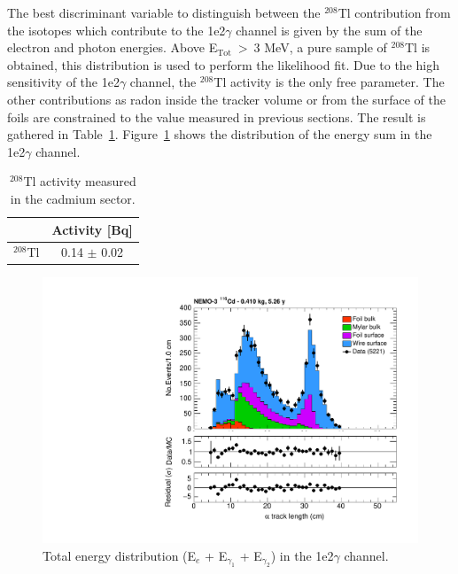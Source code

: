 \documentclass[main.tex]{subfiles}
\begin{document}
\bigskip


\NI The best discriminant variable to distinguish between the $^{\text{208}}$Tl contribution from the isotopes which contribute to the 1e2$\gamma$ channel is given by the sum of the electron and photon energies.  Above E$_{\text{Tot}}~>~$3 MeV, a pure sample of $^{\text{208}}$Tl is obtained, this distribution is used to perform the likelihood fit. Due to the high sensitivity of the 1e2$\gamma$ channel, the $^{\text{208}}$Tl activity is the only free parameter. The other contributions as radon inside the tracker volume or from the surface of the foils are constrained to the value measured in previous sections. The result is gathered in Table~\ref{TableTl208}. Figure~\ref{1e2gChannel_Etot} shows the distribution of the energy sum in the 1e2$\gamma$ channel.


\begin{table}[h!]
\centering
\begin{tabular}{c|c}
 & Activity [Bq] \\
\toprule
$^{\text{208}}$Tl & 0.14 $\pm$ 0.02 \\ 
\bottomrule
\end{tabular}
\caption{$^{\text{208}}$Tl activity measured in the cadmium sector.}
\label{TableTl208}
\end{table}



\begin{figure}[h!]
\centering
\includegraphics[page=5,scale=0.55]{pictures/Chap6/FinalPlots.pdf}
\caption{Total energy distribution (E$_e$ + E$_{\gamma_1}$ + E$_{\gamma_2}$) in the 1e2$\gamma$ channel.}
\label{1e2gChannel_Etot}
\end{figure}
\end{document}
